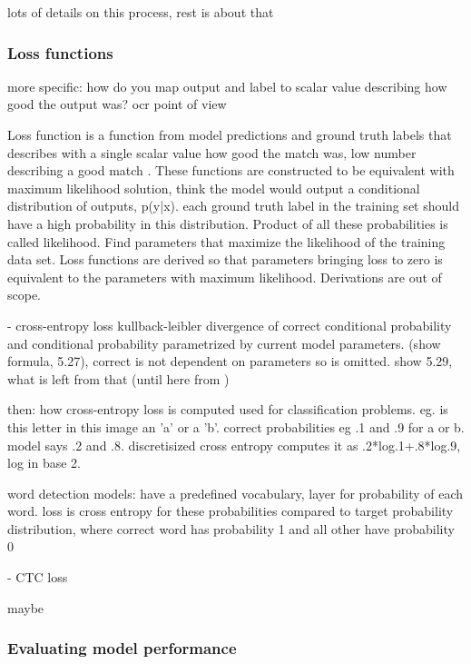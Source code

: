 \documentclass{article}
\begin{document}
lots of details on this process, rest is about that

\subsubsection{Loss functions}

more specific: how do you map output and label to scalar value describing how good the output was?
ocr point of view

Loss function is a function from model predictions and ground truth labels that describes with a single 
scalar value how good the match was, low number describing a good match \cite{princebook}.
These functions are constructed to be equivalent with maximum likelihood solution, think the model would 
output a conditional distribution of outputs, p(y|x).
each ground truth label in the training set should have a high probability in this distribution. Product of all 
these probabilities is called likelihood. Find parameters that maximize the likelihood of the training data set.
Loss functions are derived so that parameters bringing loss to zero is equivalent to the parameters with maximum likelihood.
Derivations are out of scope.

- cross-entropy loss 
kullback-leibler divergence of correct conditional probability and conditional probability parametrized by current model parameters.
(show formula, 5.27), correct is not dependent on parameters so is omitted. show 5.29, what is left from that 
(until here from \cite{princebook})

then: how cross-entropy loss is computed
used for classification problems. eg. is this letter in this image an 'a' or a 'b'.
correct probabilities eg .1 and .9 for a or b. model says .2 and .8. discretisized cross entropy computes 
it as .2*log.1+.8*log.9, log in base 2.

word detection models: have a predefined vocabulary, layer for probability of each word.
loss is cross entropy for these probabilities compared to target probability distribution, where correct word has probability 1 and 
all other have probability 0

- CTC loss

maybe

\subsubsection{Evaluating model performance}
\end{document}
